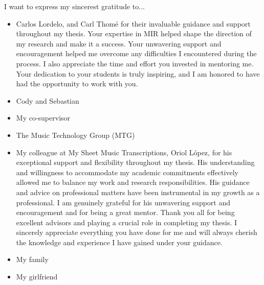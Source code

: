 

\begin{acknowledgement}

I want to express my sincerest gratitude to...

\begin{itemize}
\item Carlos Lordelo, and Carl Thomé for their invaluable guidance and support throughout my thesis. Your expertise in MIR helped shape the direction of my research and make it a success. Your unwavering support and encouragement helped me overcome any difficulties I encountered during the process. I also appreciate the time and effort you invested in mentoring me. Your dedication to your students is truly inspiring, and I am honored to have had the opportunity to work with you.
\vspace*{3mm}
\item Cody and Sebastian
\vspace*{3mm}
\item My co-supervisor
\vspace*{3mm}
\item The Music Technology Group (MTG)
\vspace*{3mm}
\item My colleague at My Sheet Music Transcriptions, Oriol López, for his exceptional support and flexibility throughout my thesis. His understanding and willingness to accommodate my academic commitments effectively allowed me to balance my work and research responsibilities. His guidance and advice on professional matters have been instrumental in my growth as a professional. I am genuinely grateful for his unwavering support and encouragement and for being a great mentor.
\vspace*{3mm}
Thank you all for being excellent advisors and playing a crucial role in completing my thesis. I sincerely appreciate everything you have done for me and will always cherish the knowledge and experience I have gained under your guidance.
\vspace*{3mm}
\item My family
\vspace*{3mm}
\item My girlfriend
\vspace*{3mm}
\end{itemize}

\newpage
\end{acknowledgement}